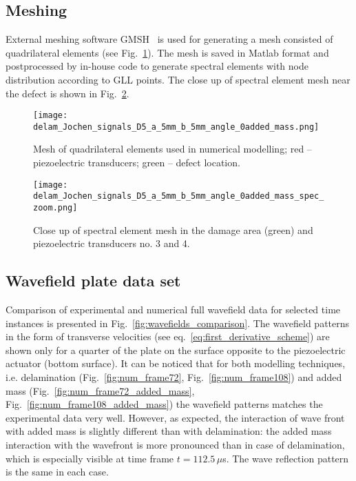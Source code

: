 \documentclass[preprint,12pt]{elsarticle}
\begin{document}
	\subsection{Meshing}
	External meshing software GMSH~\cite{Geuzaine2009} is used for generating a mesh consisted of quadrilateral elements (see Fig.~\ref{fig:quad_mesh}). The mesh is saved in Matlab format and postprocessed by in-house code to generate spectral elements with node distribution according to GLL points. The close up of spectral element mesh near the defect is shown in Fig.~\ref{fig:spec_mesh_zoom}. 
	\begin{figure} [h!]
		\centering
		\texttt{[image: delam\_Jochen\_signals\_D5\_a\_5mm\_b\_5mm\_angle\_0added\_mass.png]}	
		\caption{Mesh of quadrilateral elements used in numerical modelling; red -- piezoelectric transducers; green -- defect location.}
		\label{fig:quad_mesh}
	\end{figure}
   \begin{figure} [h!]
   	\centering
   	\texttt{[image: delam\_Jochen\_signals\_D5\_a\_5mm\_b\_5mm\_angle\_0added\_mass\_spec\_zoom.png]}	
   	\caption{Close up of spectral element mesh in the damage area (green) and piezoelectric transducers no. 3 and 4.}
   	\label{fig:spec_mesh_zoom}
   \end{figure}
   \clearpage
	
	\subsection{Wavefield plate data set }
	Comparison of experimental and numerical full wavefield data for selected time instances is presented in Fig.~\ref{fig:wavefields_comparison}. The wavefield patterns in the form of transverse velocities (see eq.~\ref{eq:first_derivative_scheme}) are shown only for a quarter of the plate on the surface opposite to the piezoelectric actuator (bottom surface). It can be noticed that for both modelling techniques, i.e. delamination (Fig.~\ref{fig:num_frame72}, Fig.~\ref{fig:num_frame108}) and added mass (Fig.~\ref{fig:num_frame72_added_mass}, Fig.~\ref{fig:num_frame108_added_mass})	the wavefield patterns matches the experimental data very well. However, as expected, the interaction of wave front with added mass is slightly different than with delamination: the added mass interaction with the wavefront is more pronounced than in case of delamination, which is especially visible at time frame $t=112.5\,  \mu$s. The wave reflection pattern is the same in each case.
	
\end{document}
